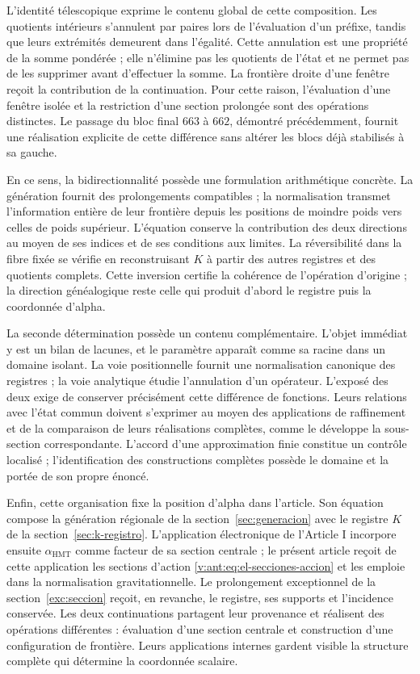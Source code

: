 L'identité télescopique exprime le contenu global de cette composition.
Les quotients intérieurs s'annulent par paires lors de l'évaluation d'un préfixe,
tandis que leurs extrémités demeurent dans l'égalité. Cette annulation est une
propriété de la somme pondérée ; elle n'élimine pas les quotients de l'état et
ne permet pas de les supprimer avant d'effectuer la somme. La frontière droite d'une
fenêtre reçoit la contribution de la continuation. Pour cette raison,
l'évaluation d'une fenêtre isolée et la restriction d'une section
prolongée sont des opérations distinctes. Le passage du bloc final $663$ à
$662$, démontré précédemment, fournit une réalisation explicite de cette
différence sans altérer les blocs déjà stabilisés à sa gauche.

En ce sens, la bidirectionnalité possède une formulation arithmétique
concrète. La génération fournit des prolongements compatibles ; la
normalisation transmet l'information entière de leur frontière depuis les
positions de moindre poids vers celles de poids supérieur. L'équation conserve la
contribution des deux directions au moyen de ses indices et de ses conditions
aux limites. La réversibilité dans la fibre fixée se vérifie en reconstruisant
$K$ à partir des autres registres et des quotients complets. Cette
inversion certifie la cohérence de l'opération d'origine ; la direction
généalogique reste celle qui produit d'abord le registre puis
la coordonnée d'alpha.

La seconde détermination possède un contenu complémentaire. L'objet
immédiat y est un bilan de lacunes, et le paramètre apparaît comme
sa racine dans un domaine isolant. La voie positionnelle fournit une
normalisation canonique des registres ; la voie analytique étudie l'annulation
d'un opérateur. L'exposé des deux exige de conserver précisément
cette différence de fonctions. Leurs relations avec l'état commun doivent
s'exprimer au moyen des applications de raffinement et de la comparaison de
leurs réalisations complètes, comme le développe la sous-section
correspondante. L'accord d'une approximation finie constitue un
contrôle localisé ; l'identification des constructions complètes
possède le domaine et la portée de son propre énoncé.

Enfin, cette organisation fixe la position d'alpha dans l'article. Son équation compose la génération régionale de la section~\ref{sec:generacion} avec le registre \(K\) de la section~\ref{sec:k-registro}. L'application électronique de l'Article I incorpore ensuite \(\alpha_{\mathrm{HMT}}\) comme facteur de sa section centrale ; le présent article reçoit de cette application les sections d'action \eqref{v:ant:eq:el-secciones-accion} et les emploie dans la normalisation gravitationnelle. Le prolongement exceptionnel de la section~\ref{exc:seccion} reçoit, en revanche, le registre, ses supports et l'incidence conservée. Les deux continuations partagent leur provenance et réalisent des opérations différentes : évaluation d'une section centrale et construction d'une configuration de frontière. Leurs applications internes gardent visible la structure complète qui détermine la coordonnée scalaire.
